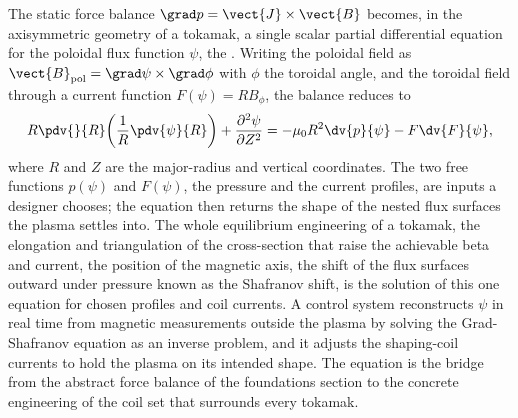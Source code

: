 \begin{mastery}
The static force balance $\grad p = \vect{J}\times\vect{B}$ becomes, in the
axisymmetric geometry of a tokamak, a single scalar partial differential
equation for the poloidal flux function $\psi$, the . Writing the poloidal field as $\vect{B}_{\mathrm{pol}} = \grad\psi
\times\grad\phi$ with $\phi$ the toroidal angle, and the toroidal field through a
current function $F(\psi) = R B_\phi$, the balance reduces to
\[
R\pdv{}{R}\!\left(\frac{1}{R}\pdv{\psi}{R}\right)
+ \frac{\partial^{2}\psi}{\partial Z^{2}}
= -\mu_0 R^{2}\dv{p}{\psi} - F\dv{F}{\psi},
\]
where $R$ and $Z$ are the major-radius and vertical coordinates. The two free
functions $p(\psi)$ and $F(\psi)$, the pressure and the current profiles, are
inputs a designer chooses; the equation then returns the shape of the nested
flux surfaces the plasma settles into. The whole equilibrium engineering of a
tokamak, the elongation and triangulation of the cross-section that raise the
achievable beta and current, the position of the magnetic axis, the shift of the
flux surfaces outward under pressure known as the Shafranov shift, is the
solution of this one equation for chosen profiles and coil currents. A control
system reconstructs $\psi$ in real time from magnetic measurements outside the
plasma by solving the Grad-Shafranov equation as an inverse problem, and it
adjusts the shaping-coil currents to hold the plasma on its intended shape. The
equation is the bridge from the abstract force balance of the foundations
section to the concrete engineering of the coil set that surrounds every
tokamak.
\end{mastery}

